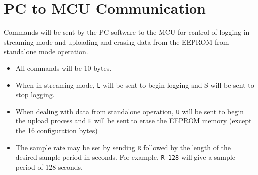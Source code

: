 \documentclass[a4paper,11pt]{article}  %
\begin{document}
\section{PC to MCU Communication}

Commands will be sent by the PC software to the MCU for control of
logging in streaming mode and uploading and erasing data from the
EEPROM from standalone mode operation.
\begin{itemize}
\item All commands will be 10 bytes.
  \item When in streaming mode, \texttt{L} will be sent to begin
    logging and S will be sent to stop logging.
  \item When dealing with data from standalone operation, \texttt{U}
    will be sent to begin the upload process and \texttt{E} will be
    sent to erase the EEPROM memory (except the 16 configuration
    bytes)
  \item The sample rate may be set by sending \texttt{R} followed by
    the length of the desired sample period in seconds. For example,
    \texttt{R 128} will give a sample period of 128 seconds.
\end{itemize}
\end{document}
